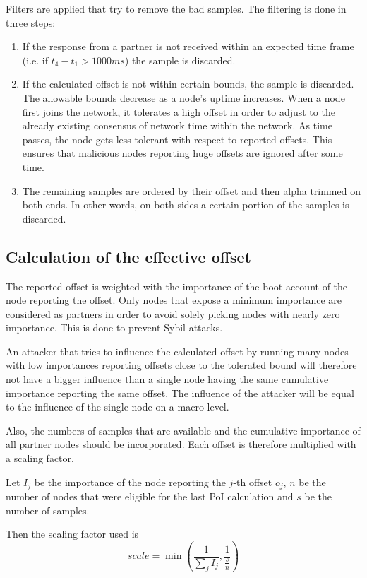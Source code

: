 Filters are applied that try to remove the bad samples. The filtering is done in three steps:
\begin{enumerate}
\item If the response from a partner is not received within an expected time frame (i.e. if $t_4-t_1 > 1000ms$) the sample is discarded.
\item If the calculated offset is not within certain bounds, the sample is discarded.
The allowable bounds decrease as a node's uptime increases.
When a node first joins the network, it tolerates a high offset in order to adjust to the already existing consensus of network time within the network.
As time passes, the node gets less tolerant with respect to reported offsets.
This ensures that malicious nodes reporting huge offsets are ignored after some time.
\item The remaining samples are ordered by their offset and then alpha trimmed on both ends.
In other words, on both sides a certain portion of the samples is discarded.
\end{enumerate}

\subsection{Calculation of the effective offset}

The reported offset is weighted with the importance of the boot account of the node reporting the offset.
Only nodes that expose a minimum importance are considered as partners in order to avoid solely picking nodes with nearly zero importance.
This is done to prevent Sybil attacks.

An attacker that tries to influence the calculated offset by running many nodes with low importances reporting offsets close to the tolerated bound will therefore not have a bigger influence than a single node having the same cumulative importance reporting the same offset.
The influence of the attacker will be equal to the influence of the single node on a macro level.

Also, the numbers of samples that are available and the cumulative importance of all partner nodes should be incorporated.
Each offset is therefore multiplied with a scaling factor.

Let $I_j$ be the importance of the node reporting the $j$-th offset $o_j$,
$\textit{n}$ be the number of nodes that were eligible for the last PoI calculation and $\textit{s}$ be the number of samples.

Then the scaling factor used is
$$ \textit{scale} = \min\left(\frac{1}{\sum_j I_j}, \frac{1}{\frac{\textit{s}}{\textit{n}}}\right)$$


